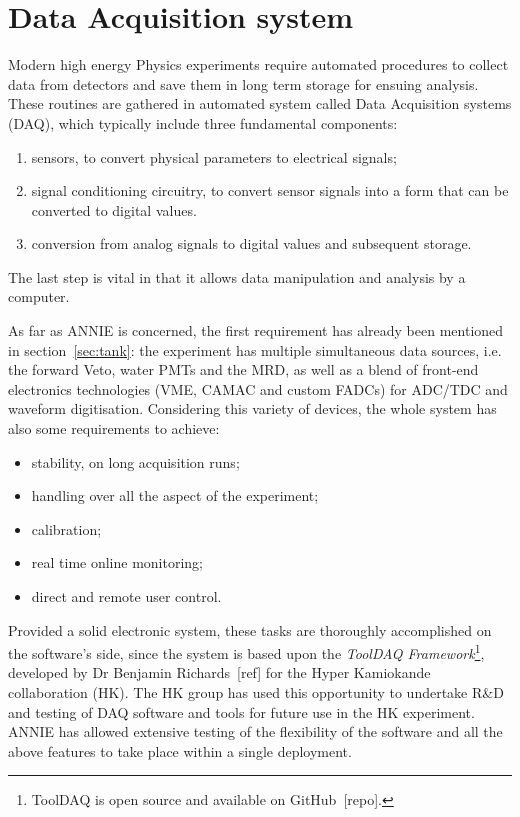 
 \chapter[Data Acquisition]{Data Acquisition system}
 \label{cha:daq}

 Modern high energy Physics experiments require automated procedures to collect data from detectors %
 and save them in long term storage for ensuing analysis.
 These routines are gathered in automated system called Data Acquisition systems (DAQ), %
 which typically include three fundamental components:
 \begin{enumerate}
   \item sensors, to convert physical parameters to electrical signals;
   \item signal conditioning circuitry, to convert sensor signals into a form that %
     can be converted to digital values.
   \item conversion from analog signals to digital values and subsequent storage.
 \end{enumerate}
 The last step is vital in that it allows data manipulation and analysis by a computer.
 
 As far as ANNIE is concerned, the first requirement has already been mentioned in section~\ref{sec:tank}: %
 the experiment has multiple simultaneous data sources, i.e. %
 the forward Veto, water PMTs and the MRD, as well as a blend of front-end %
 electronics technologies (VME, CAMAC and custom FADCs) for ADC/TDC and waveform digitisation.
 Considering this variety of devices, the whole system has also some requirements to achieve:
 \begin{itemize}
   \item stability, on long acquisition runs;
   \item handling over all the aspect of the experiment;
   \item calibration;
   \item real time online monitoring;
   \item direct and remote user control.
 \end{itemize}
 
 Provided a solid electronic system, these tasks are thoroughly accomplished on the %
 software's side, since the system is based upon the %
 \emph{ToolDAQ Framework}\footnote{ToolDAQ %
   is open source and available on GitHub~[repo].}, developed %
 by Dr Benjamin Richards~[ref] for the Hyper Kamiokande collaboration (HK).
 The HK group has used this opportunity to undertake R\&D and testing of %
 DAQ software and tools for future use in the HK experiment.
 ANNIE has allowed extensive testing of the flexibility of the software %
 and all the above features to take place within a single deployment.
 
